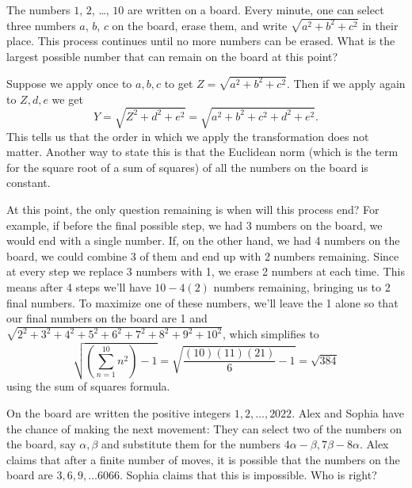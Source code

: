 \begin{problem}
     The numbers $1$, $2$, \dots, $10$ are written on a board.
  Every minute, one can select three numbers
  $a$, $b$, $c$ on the board, erase them,
  and write $\sqrt{a^2+b^2+c^2}$ in their place.
  This process continues until no more numbers can be erased.
  What is the largest possible number
  that can remain on the board at this point?
\end{problem}

\begin{solution}[$\sqrt{384}$]
    Suppose we apply once to $a,b,c$ to get \(Z=\sqrt{a^2+b^2+c^2}\). Then if we apply again to $Z, d,e$ we get
    \[
        Y=\sqrt{Z^2+d^2+e^2} = \sqrt{a^2+b^2+c^2+d^2+e^2}.
    \]
    This tells us that the order in which we apply the transformation does not matter. Another way to state this is that the Euclidean norm (which is the term for the square root of a sum of squares) of all the numbers on the board is constant.

    At this point, the only question remaining is when will this process end? For example, if before the final possible step, we had 3 numbers on the board, we would end with a single number. If, on the other hand, we had 4 numbers on the board, we could combine 3 of them and end up with 2 numbers remaining. Since at every step we replace 3 numbers with 1, we erase 2 numbers at each time. This means after 4 steps we'll have $10-4(2)$ numbers remaining, bringing us to 2 final numbers. To maximize one of these numbers, we'll leave the 1 alone so that our final numbers on the board are 1 and $\sqrt{2^2+3^2+4^2+5^2+6^2+7^2+8^2+9^2+10^2}$, which simplifies to
    \[\sqrt{\left(\sum_{n=1}^{10}n^2\right)-1}=\sqrt{\frac{(10)(11)(21)}{6}-1} = \boxed{\sqrt{384}}\]
    using the sum of squares formula.
\end{solution}


\begin{problem}[C][4][Cuba 2022/6]
    On the board are written the positive integers $1, 2, \ldots, 2022$. Alex and Sophia have the chance of making the next movement:
    They can select two of the numbers on the board, say $\alpha, \beta$ and substitute them for the numbers $4 \alpha - \beta, 7 \beta - 8 \alpha$. Alex claims that after a finite number of moves, it is possible that the numbers on the board are $3, 6, 9, \ldots 6066$. Sophia claims that this is impossible. Who is right?
\end{problem}


